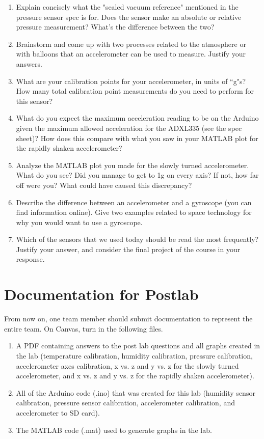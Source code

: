 \documentclass[12pt]{article}
\begin{document}
\begin{enumerate}
		\item Explain concisely what the "sealed vacuum reference" mentioned in the pressure sensor spec is for. Does the sensor make an absolute or relative pressure measurement? What's the difference between the two?
		
		\item Brainstorm and come up with two processes related to the atmosphere or with balloons that an accelerometer can be used to measure. Justify your answers.
		
		\item What are your calibration points for your accelerometer, in units of ``g"s? How many total calibration point measurements do you need to perform for this sensor?
        
        \item What do you expect the maximum acceleration reading to be on the Arduino given the maximum allowed acceleration for the ADXL335 (see the spec sheet)? How does this compare with what you saw in your MATLAB plot for the rapidly shaken accelerometer?
        
        \item Analyze the MATLAB plot you made for the slowly turned accelerometer. What do you see? Did you manage to get to 1g on every axis? If not, how far off were you? What could have caused this discrepancy? 
        
        \item Describe the difference between an accelerometer and a gyroscope (you can find information online). Give two examples related to space technology for why you would want to use a gyroscope.
        
        \item Which of the sensors that we used today should be read the most frequently? Justify your answer, and consider the final project of the course in your response.
        
	\end{enumerate}
    
    
   \section*{Documentation for Postlab}
    From now on, one team member should submit documentation to represent the entire team. On Canvas, turn in the following files.
    \begin{enumerate}
        \item A PDF containing answers to the post lab questions and all graphs created in the lab (temperature calibration, humidity calibration, pressure calibration, accelerometer axes calibration, x vs. z and y vs. z for the slowly turned accelerometer, and x vs. z and y vs. z for the rapidly shaken accelerometer).
        \item All of the Arduino code (.ino) that was created for this lab (humidity sensor calibration, pressure sensor calibration, accelerometer calibration, and accelerometer to SD card).
        \item The MATLAB code (.mat) used to generate graphs in the lab.
    \end{enumerate}
\end{document}
